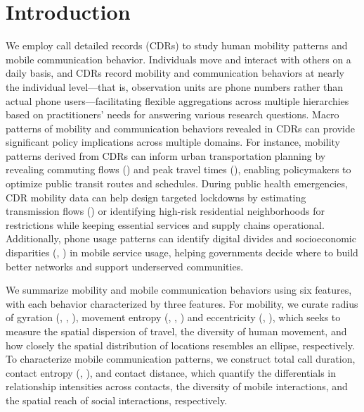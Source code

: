 \chapter{Introduction}
We employ call detailed records (CDRs) to study human mobility patterns and mobile communication behavior.
Individuals move and interact with others on a daily basis, and CDRs record mobility and communication behaviors at nearly the individual level---that is, observation units are phone numbers rather than actual phone users---facilitating flexible aggregations across multiple hierarchies based on practitioners' needs for answering various research questions.
Macro patterns of mobility and communication behaviors revealed in CDRs can provide significant policy implications across multiple domains.
For instance, mobility patterns derived from CDRs can inform urban transportation planning by revealing commuting flows (\cite{phithakkitnukoon2012socio}) and peak travel times (\cite{tongsinoot2017exploring}), enabling policymakers to optimize public transit routes and schedules.
During public health emergencies, CDR mobility data can help design targeted lockdowns by estimating transmission flows (\cite{wesolowski2016connecting}) or identifying high-risk  residential neighborhoods for restrictions while keeping essential services and supply chains operational.
Additionally, phone usage patterns can identify digital divides and socioeconomic disparities (\cite{onnela2007structure}, \cite{blumenstock2015predicting}) in mobile service usage, helping governments decide where to build better networks and support underserved communities.

We summarize mobility and mobile communication behaviors using six features, with each behavior characterized by three features.
For mobility, we curate radius of gyration (\cite{gonzalez2008understanding}, \cite{ranjan2012call}, \cite{pappalardo2015returners}), movement entropy (\cite{eagle2010network}, \cite{song2010limits}, \cite{pappalardo2016analytical}) and eccentricity (\cite{yuan2012correlating}, \cite{zhao2019effect}), which seeks to measure the spatial dispersion of travel, the diversity of human movement, and how closely the spatial distribution of locations resembles an ellipse, respectively.
To characterize mobile communication patterns, we construct total call duration, contact entropy (\cite{eagle2010network}, \cite{pappalardo2016analytical}), and contact distance, which quantify the differentials in relationship intensities across contacts, the diversity of mobile interactions, and the spatial reach of social interactions, respectively.

